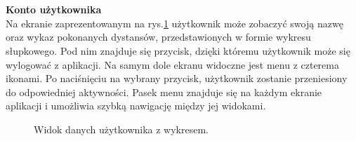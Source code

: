 \\~\\
\noindent
\textbf{Konto użytkownika} \\
\indent Na ekranie zaprezentowanym na rys.\ref{widok:user} użytkownik może zobaczyć swoją nazwę oraz wykaz pokonanych dystansów, przedstawionych w formie wykresu słupkowego. Pod nim znajduje się przycisk, dzięki któremu użytkownik może się wylogować z aplikacji. Na samym dole ekranu widoczne jest menu z czterema ikonami. Po naciśnięciu na wybrany przycisk, użytkownik zostanie przeniesiony do odpowiedniej aktywności. Pasek menu znajduje się na każdym ekranie aplikacji i umożliwia szybką nawigację między jej widokami.\\
\begin{figure}[H]
    \centering
    \caption{Widok danych użytkownika z wykresem.}
    \label{widok:user}
\end{figure}

